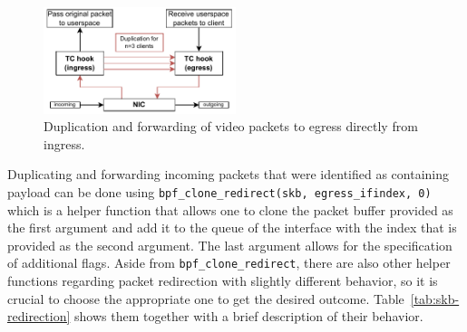 \begin{figure}[htbp]
    \centering
    \includegraphics[width=0.5\textwidth]{figures/03_fast_relays/packet-forwarding.drawio.pdf}
    \caption[Video packet duplication]{Duplication and forwarding of video packets to egress directly 
    from ingress.}\label{fig:packet-forwarding-duplication}
\end{figure}

\noindent
Duplicating and forwarding incoming packets that were identified as containing payload can be done 
using \verb|bpf_clone_redirect(skb, egress_ifindex, 0)| which is a helper function
that allows one to clone the packet buffer provided as the first argument and add it to the 
queue of the interface with the index that is provided as the second argument.
The last argument allows for the specification of additional flags.
Aside from \verb|bpf_clone_redirect|, there are also other helper functions regarding packet
redirection with slightly different behavior, so it is crucial to choose the appropriate one
to get the desired outcome.
Table~\ref{tab:skb-redirection} shows them together with a brief description of their behavior.

